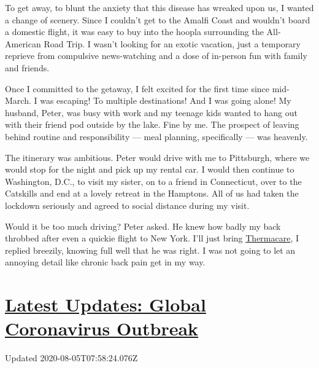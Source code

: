 To get away, to blunt the anxiety that this disease has wreaked upon us,
I wanted a change of scenery. Since I couldn't get to the Amalfi Coast
and wouldn't board a domestic flight, it was easy to buy into the hoopla
surrounding the All-American Road Trip. I wasn't looking for an exotic
vacation, just a temporary reprieve from compulsive news-watching and a
dose of in-person fun with family and friends.

Once I committed to the getaway, I felt excited for the first time since
mid-March. I was escaping! To multiple destinations! And I was going
alone! My husband, Peter, was busy with work and my teenage kids wanted
to hang out with their friend pod outside by the lake. Fine by me. The
prospect of leaving behind routine and responsibility --- meal planning,
specifically --- was heavenly.

The itinerary was ambitious. Peter would drive with me to Pittsburgh,
where we would stop for the night and pick up my rental car. I would
then continue to Washington, D.C., to visit my sister, on to a friend in
Connecticut, over to the Catskills and end at a lovely retreat in the
Hamptons. All of us had taken the lockdown seriously and agreed to
social distance during my visit.

Would it be too much driving? Peter asked. He knew how badly my back
throbbed after even a quickie flight to New York. I'll just bring
\href{https://www.thermacare.com/heat-wraps/back-pain-therapy}{Thermacare},
I replied breezily, knowing full well that he was right. I was not going
to let an annoying detail like chronic back pain get in my way.

\hypertarget{latest-updates-global-coronavirus-outbreak}{%
\section{\texorpdfstring{\href{https://www.nytimes.com/2020/08/04/world/coronavirus-cases.html?action=click\&pgtype=Article\&state=default\&region=MAIN_CONTENT_1\&context=storylines_live_updates}{Latest
Updates: Global Coronavirus
Outbreak}}{Latest Updates: Global Coronavirus Outbreak}}\label{latest-updates-global-coronavirus-outbreak}}

Updated 2020-08-05T07:58:24.076Z

